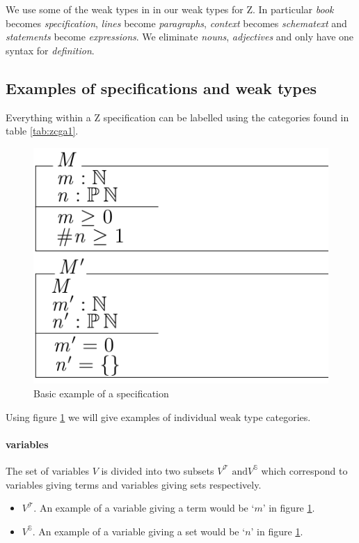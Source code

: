 We use some of the weak types in \cite{wtt} in our weak types for Z. In
particular \emph{book} becomes \emph{specification}, \emph{lines} become
\emph{paragraphs}, \emph{context} becomes \emph{schematext} and
\emph{statements} become \emph{expressions}. We eliminate \emph{nouns},
\emph{adjectives} and only have one syntax for \emph{definition}.

\subsection{Examples of specifications and weak types}
Everything within a Z specification can be labelled using the categories found
in table \ref{tab:zcga1}.

\begin{figure}[H]
\centering
\includegraphics[scale=0.4]{Figures/zcga/toy.png}
\caption{Basic example of a specification \label{fig:toy}}
\end{figure}

Using figure \ref{fig:toy} we will give examples of individual weak type
categories.

\paragraph{variables}
\label{subsubsec:variables}

The set of variables $V$ is divided into two subsets $V^{\mathcal{T}}\text{ and
} V^{\mathbb{S}}$ which correspond to variables giving terms and variables
giving sets respectively.

\begin{itemize}
\item $V^{\mathcal{T}}$. An example of a variable giving a term would be `$m$'
in figure \ref{fig:toy}.

\item $V^{\mathbb{S}}$. An example of a variable giving a set would be `$n$' in
figure \ref{fig:toy}.
\end{itemize}

